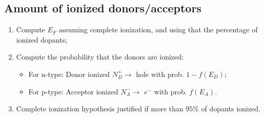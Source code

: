 \documentclass[a4paper, fontsize=8pt, landscape, DIV=1]{scrartcl}
\begin{document}
\begin{multicols*}{4}
\subsection{Amount of ionized donors/acceptors}
\begin{enumerate}
	\item Compute $E_F$ assuming complete ionization, and using that the percentage of ionized dopants;
	\item Compute the probability that the donors are ionized:
	\begin{itemize}[nolistsep,noitemsep]
		\item For n-type: Donor ionized $N_D^+\rightarrow$ hole with prob. $1-f(E_D)$;
		\item For p-type: Acceptor ionized $N_A^-\rightarrow$ $e^-$ with prob. $f(E_A)$.
	\end{itemize}
	\item Complete ionization hypothesis justified if more than $95\%$ of dopants ionized.
\end{enumerate}


\end{multicols*}
\end{document}
